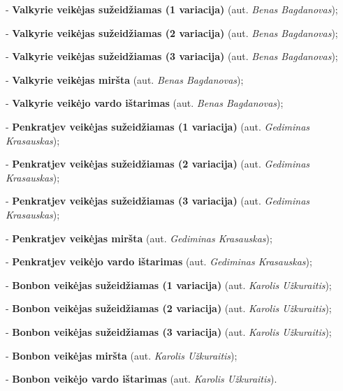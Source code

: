 \documentclass{VUMIFPSkursinis}
\begin{document}
\item - \textbf{Valkyrie veikėjas sužeidžiamas (1 variacija)} (aut. \textit{Benas Bagdanovas});
\item - \textbf{Valkyrie veikėjas sužeidžiamas (2 variacija)} (aut. \textit{Benas Bagdanovas});
\item - \textbf{Valkyrie veikėjas sužeidžiamas (3 variacija)} (aut. \textit{Benas Bagdanovas});
\item - \textbf{Valkyrie veikėjas miršta} (aut. \textit{Benas Bagdanovas});
\item - \textbf{Valkyrie veikėjo vardo ištarimas} (aut. \textit{Benas Bagdanovas});

\item - \textbf{Penkratjev veikėjas sužeidžiamas (1 variacija)} (aut. \textit{Gediminas Krasauskas});
\item - \textbf{Penkratjev veikėjas sužeidžiamas (2 variacija)} (aut. \textit{Gediminas Krasauskas});
\item - \textbf{Penkratjev veikėjas sužeidžiamas (3 variacija)} (aut. \textit{Gediminas Krasauskas});
\item - \textbf{Penkratjev veikėjas miršta} (aut. \textit{Gediminas Krasauskas});
\item - \textbf{Penkratjev veikėjo vardo ištarimas} (aut. \textit{Gediminas Krasauskas});

\item - \textbf{Bonbon veikėjas sužeidžiamas (1 variacija)} (aut. \textit{Karolis Užkuraitis});
\item - \textbf{Bonbon veikėjas sužeidžiamas (2 variacija)} (aut. \textit{Karolis Užkuraitis});
\item - \textbf{Bonbon veikėjas sužeidžiamas (3 variacija)} (aut. \textit{Karolis Užkuraitis});
\item - \textbf{Bonbon veikėjas miršta} (aut. \textit{Karolis Užkuraitis});
\item - \textbf{Bonbon veikėjo vardo ištarimas} (aut. \textit{Karolis Užkuraitis}).


\end{document}

